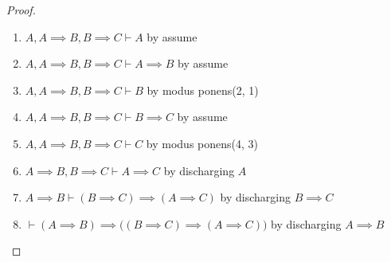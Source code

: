 \begin{proof}
\begin{enumerate}
\item $A,A\implies B, B\implies C\vdash A$ by assume
\item $A,A\implies B, B\implies C\vdash A\implies B$ by assume
\item $A,A\implies B, B\implies C\vdash B$ by modus ponens(2, 1)
\item $A,A\implies B, B\implies C\vdash B\implies C$ by assume
\item $A,A\implies B, B\implies C\vdash C$ by modus ponens(4, 3)
\item $A\implies B, B\implies C\vdash A\implies C$ by discharging $A$
\item $A\implies B\vdash(B\implies C)\implies(A\implies C)$ by discharging $B\implies C$
\item $\vdash(A\implies B)\implies\bigl((B\implies C)\implies(A\implies C)\bigr)$ by discharging $A\implies B$\qedhere
\end{enumerate}
\end{proof}

